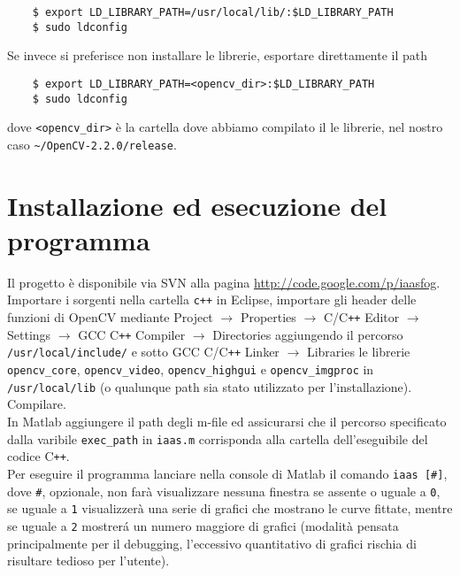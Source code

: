 \documentclass[12pt]{report}
\begin{document}
\begin{verbatim}
	$ export LD_LIBRARY_PATH=/usr/local/lib/:$LD_LIBRARY_PATH
	$ sudo ldconfig
\end{verbatim}

\noindent Se invece si preferisce non installare le librerie, esportare direttamente il path 

\begin{verbatim}
	$ export LD_LIBRARY_PATH=<opencv_dir>:$LD_LIBRARY_PATH
	$ sudo ldconfig
\end{verbatim}

\noindent dove \verb|<opencv_dir>| \`e la cartella dove abbiamo compilato il le librerie, nel nostro caso \verb|~/OpenCV-2.2.0/release|.

\section{Installazione ed esecuzione del programma}
\noindent Il progetto \`e disponibile via SVN alla pagina \url{http://code.google.com/p/iaasfog}.\\
Importare i sorgenti nella cartella \verb|c++| in Eclipse, importare gli header delle funzioni di OpenCV mediante Project $\rightarrow$ Properties  $\rightarrow$ C\slash C\verb|++| Editor $\rightarrow$ Settings $\rightarrow$ GCC C\verb|++| Compiler $\rightarrow$ Directories aggiungendo il percorso \verb|/usr/local/include/| e sotto GCC C\slash C\verb|++| Linker $\rightarrow$ Libraries le librerie \verb|opencv_core|, \verb|opencv_video|, \verb|opencv_highgui| e \verb|opencv_imgproc| in \verb|/usr/local/lib| (o qualunque path sia stato utilizzato per l'installazione).\\
Compilare.\\

\noindent In Matlab aggiungere il path degli m-file ed assicurarsi che il percorso specificato dalla varibile \verb|exec_path| in \verb|iaas.m| corrisponda alla cartella dell'eseguibile del codice C\verb|++|.\\
Per eseguire il programma lanciare nella console di Matlab il comando \verb|iaas [#]|, dove \verb|#|, opzionale, non far\`a visualizzare nessuna finestra se assente o uguale a \verb|0|, se uguale a \verb|1| visualizzer\`a una serie di grafici che mostrano le curve fittate, mentre se uguale a \verb|2| mostrer\'a un numero maggiore di grafici (modalit\`a pensata principalmente per il debugging, l'eccessivo quantitativo di grafici rischia di risultare tedioso per l'utente).

\printbibliography
\end{document}
